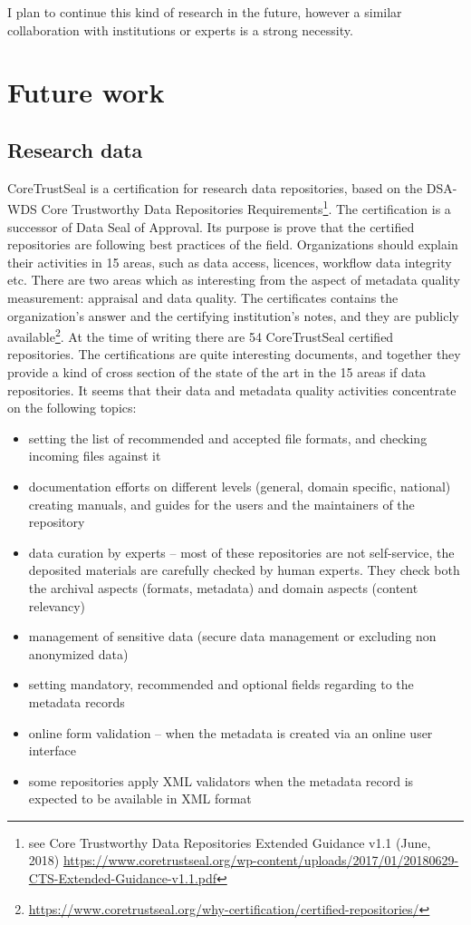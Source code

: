 I plan to continue this kind of research in the future, however a similar collaboration with institutions or experts is a strong necessity.

\section{Future work}

\subsection{Research data}

CoreTrustSeal is a certification for research data repositories, based on the DSA-WDS Core Trustworthy Data Repositories Requirements\footnote{see Core Trustworthy Data Repositories Extended Guidance v1.1 (June, 2018) \url{https://www.coretrustseal.org/wp-content/uploads/2017/01/20180629-CTS-Extended-Guidance-v1.1.pdf}}. The certification is a successor of Data Seal of Approval. Its purpose is prove that the certified repositories are following best practices of the field. Organizations should explain their activities in 15 areas, such as data access, licences, workflow data integrity etc. There are two areas which as interesting from the aspect of metadata quality measurement: appraisal and data quality. The certificates contains the organization's answer and the certifying institution's notes, and they are publicly available\footnote{\url{https://www.coretrustseal.org/why-certification/certified-repositories/}}. At the time of writing there are 54 CoreTrustSeal certified repositories. The certifications are quite interesting documents, and together they provide a kind of cross section of the state of the art in the 15 areas if data repositories. It seems that their data and metadata quality activities concentrate on the following topics:

\begin{itemize}
  \setlength{\parskip}{0pt}
  \setlength{\itemsep}{0pt plus 1pt}
  \item setting the list of recommended and accepted file formats, and checking incoming files against it
  \item documentation efforts on different levels (general, domain specific, national) creating manuals, and guides for the users and the maintainers of the repository
  \item data curation by experts -- most of these repositories are not self-service, the deposited materials are carefully checked by human experts. They check both the archival aspects (formats, metadata) and domain aspects (content relevancy)
  \item management of sensitive data (secure data management or excluding non anonymized data)
  \item setting mandatory, recommended and optional fields regarding to the metadata records
  \item online form validation -- when the metadata is created via an online user interface
  \item some repositories apply XML validators when the metadata record is expected to be available in XML format
\end{itemize}

